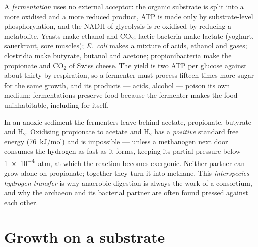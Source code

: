 \begin{definition}\label{def:b2:microbial-metabolism:fermentation}
A \emph{fermentation} uses no external acceptor: the organic
substrate is split into a more oxidised and a more reduced product,
ATP is made only by substrate-level phosphorylation, and the NADH of
glycolysis is re-oxidised by reducing a metabolite. Yeasts make
ethanol and $\mathrm{CO_2}$; lactic bacteria make lactate (yoghurt,
sauerkraut, sore muscles); \emph{E.~coli} makes a mixture of acids,
ethanol and gases; clostridia make butyrate, butanol and acetone;
propionibacteria make the propionate and $\mathrm{CO_2}$ of Swiss
cheese. The yield is two ATP per glucose against about thirty by
respiration, so a fermenter must process fifteen times more sugar
for the same growth, and its products --- acids, alcohol --- poison
its own medium: fermentations preserve food because the fermenter
makes the food uninhabitable, including for itself.
\end{definition}

\begin{example}\label{ex:b2:microbial-metabolism:syntrophy}
In an anoxic sediment the fermenters leave behind acetate, propionate,
butyrate and $\mathrm{H_2}$. Oxidising propionate to acetate and
$\mathrm{H_2}$ has a \emph{positive} standard free energy
(\qty{+76}{kJ/mol}) and is impossible --- unless a methanogen next
door consumes the hydrogen as fast as it forms, keeping its partial
pressure below \qty{1e-4}{atm}, at which the reaction becomes
exergonic. Neither partner can grow alone on propionate; together
they turn it into methane. This \emph{interspecies hydrogen
transfer} is why anaerobic digestion is always the work of a
consortium, and why the archaeon and its bacterial partner are often
found pressed against each other.
\end{example}

\section{Growth on a substrate}

